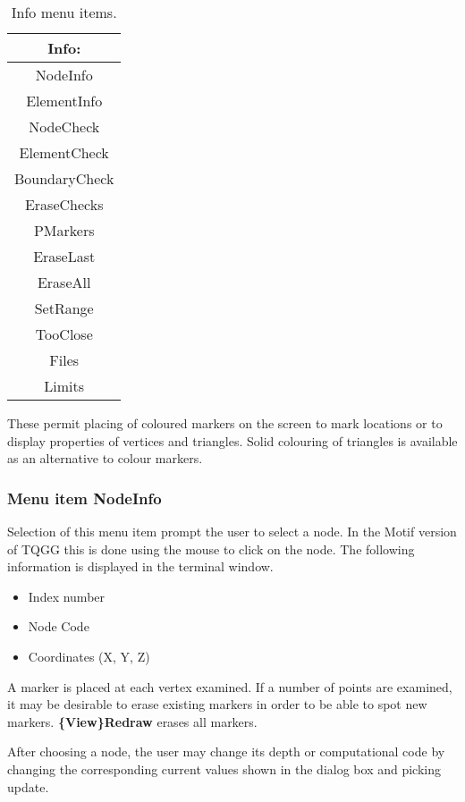 \documentclass{article}
\begin{document}
\begin{table}[htb!]
 \caption{Info menu items.}
  \begin{center}
   \begin{tabular}{|c|}
    \hline
Info:\\     \hline
NodeInfo \\ ElementInfo \\     \hline
NodeCheck \\ ElementCheck \\ BoundaryCheck \\ EraseChecks \\     \hline
PMarkers \\ EraseLast \\ EraseAll \\     \hline
SetRange \\ TooClose \\     \hline
Files \\ Limits \\
    \hline
   \end{tabular}
   \label{tab:INFO}
  \end{center}
\end{table}

These permit placing of coloured markers on the screen to mark locations or to display properties of vertices and triangles. Solid colouring of triangles is available as an alternative to colour markers.

\subsubsection{Menu item NodeInfo}
Selection of this menu item prompt the user to select a node.  In the Motif version of TQGG this is done using the mouse to click on the node.  The following information is displayed in the terminal window.

\begin{itemize}
\item Index number
\item Node Code
\item Coordinates (X, Y, Z)
\end{itemize}

A marker is placed at each vertex examined. If a number of points are examined, it may be desirable to erase existing markers in order to be able to spot new markers. \textbf{\{View\}Redraw} erases all markers.

After choosing a node, the user may change its depth or computational code by changing the corresponding current values shown in the dialog box and picking update.
\end{document}
